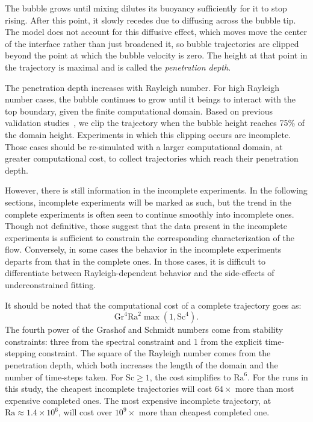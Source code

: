 The bubble grows until mixing dilutes its buoyancy sufficiently for it to stop rising.
After this point, it slowly recedes due to diffusing across the bubble tip.
The model does not account for this diffusive effect, which moves move the center of the interface rather than just broadened it, so bubble trajectories are clipped beyond the point at which the bubble velocity is zero.
The height at that point in the trajectory is maximal and is called the \textit{penetration depth}.

The penetration depth increases with Rayleigh number.
For high Rayleigh number cases, the bubble continues to grow until it beings to interact with the top boundary, given the finite computational domain.
Based on previous validation studies~\cite{Hutchinson2016}, we clip the trajectory when the bubble height reaches 75\% of the domain height.
Experiments in which this clipping occurs are incomplete.
Those cases should be re-simulated with a larger computational domain, at greater computational cost, to collect trajectories which reach their penetration depth.

However, there is still information in the incomplete experiments.
In the following sections, incomplete experiments will be marked as such, but the trend in the complete experiments is often seen to continue smoothly into incomplete ones.
Though not definitive, those suggest that the data present in the incomplete experiments is sufficient to constrain the corresponding characterization of the flow.
Conversely, in some cases the behavior in the incomplete experiments departs from that in the complete ones. 
In those cases, it is difficult to differentiate between Rayleigh-dependent behavior and the side-effects of underconstrained fitting.

It should be noted that the computational cost of a complete trajectory goes as:
\begin{equation}
\text{Gr}^4 \text{Ra}^2 \max(1, \text{Sc}^4).
\end{equation}
The fourth power of the Grashof and Schmidt numbers come from stability constraints: three from the spectral constraint and 1 from the explicit time-stepping constraint.
The square of the Rayleigh number comes from the penetration depth, which both increases the length of the domain and the number of time-steps taken.
For $\text{Sc} \ge 1$, the cost simplifies to $\text{Ra}^6$.
For the runs in this study, the cheapest incomplete trajectories will cost $64\times$ more than most expensive completed ones.
The most expensive incomplete trajectory, at $\text{Ra} \approx 1.4\times 10^6$, will cost over $10^9\times$ more than cheapest completed one.


